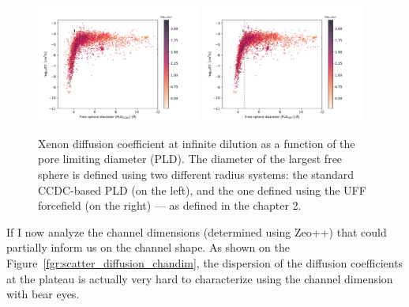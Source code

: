 \documentclass[main]{subfiles}
\begin{document}
\begin{figure}[ht]
  \centering
    \includegraphics[width=0.48\textwidth]{figures/5-diffusion/D_log-diameter_ccdc_colored_s_+.pdf}
    \includegraphics[width=0.48\textwidth]{figures/5-diffusion/D_log-diameter_colored_s_+.pdf}
    \caption{Xenon diffusion coefficient at infinite dilution as a function of the pore limiting diameter (PLD). The diameter of the largest free sphere is defined using two different radius systems: the standard CCDC-based PLD (on the left), and the one defined using the UFF forcefield (on the right)\autocite{Hung_2021} --- as defined in the chapter 2. }\label{fgr:diff_pld}
\end{figure}

If I now analyze the channel dimensions (determined using Zeo++) that could partially inform us on the channel shape. As shown on the Figure~\ref{fgr:scatter_diffusion_chandim}, the dispersion of the diffusion coefficients at the plateau is actually very hard to characterize using the channel dimension with bear eyes. 
\end{document}
